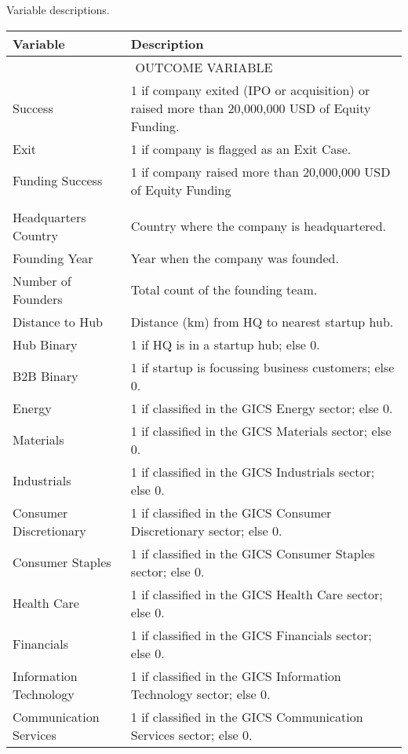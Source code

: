 \centering
{\footnotesize
\caption{Variable descriptions.}
\label{tab:var_desc}
\begin{tabular}{p{} p{}}
\toprule
Variable & Description \\
\midrule
\multicolumn{2}{c}{\tiny\textsc{OUTCOME VARIABLE}} \\
\midrule
Success & 1 if company exited (IPO or acquisition) or raised more than 20,000,000 USD of Equity Funding. \\[0.4em]
Exit & 1 if company is flagged as an Exit Case. \\[0.4em]
Funding Success & 1 if company raised more than 20,000,000 USD of Equity Funding \\[0.4em]
\addlinespace[0.5em]
\midrule
\multicolumn{2}{c}{\tiny\textsc{FUNDAMENTAL VARIABLES}} \\
\midrule
Headquarters Country & Country where the company is headquartered. \\[0.4em]
Founding Year & Year when the company was founded. \\[0.4em]
Number of Founders & Total count of the founding team. \\[0.4em]
Distance to Hub & Distance (km) from HQ to nearest startup hub. \\[0.4em]
Hub Binary & 1 if HQ is in a startup hub; else 0. \\[0.4em]
B2B Binary & 1 if startup is focussing business customers; else 0. \\[0.4em]
Energy & 1 if classified in the GICS Energy sector; else 0. \\[0.4em]
Materials & 1 if classified in the GICS Materials sector; else 0. \\[0.4em]
Industrials & 1 if classified in the GICS Industrials sector; else 0. \\[0.4em]
Consumer Discretionary & 1 if classified in the GICS Consumer Discretionary sector; else 0. \\[0.4em]
Consumer Staples & 1 if classified in the GICS Consumer Staples sector; else 0. \\[0.4em]
Health Care & 1 if classified in the GICS Health Care sector; else 0. \\[0.4em]
Financials & 1 if classified in the GICS Financials sector; else 0. \\[0.4em]
Information Technology & 1 if classified in the GICS Information Technology sector; else 0. \\[0.4em]
Communication Services & 1 if classified in the GICS Communication Services sector; else 0. \\[0.4em]

\end{tabular}}
